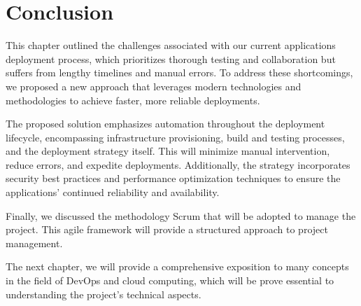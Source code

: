 \section*{Conclusion}
This chapter outlined the challenges associated with our current applications deployment process, which prioritizes thorough testing and collaboration but suffers from lengthy timelines and manual errors. To address these shortcomings, we proposed a new approach that leverages modern technologies and methodologies to achieve faster, more reliable deployments.
\par
The proposed solution emphasizes automation throughout the deployment lifecycle, encompassing infrastructure provisioning, build and testing processes, and the deployment strategy itself. This will minimize manual intervention, reduce errors, and expedite deployments. Additionally, the strategy incorporates security best practices and performance optimization techniques to ensure the applications' continued reliability and availability.
\par
Finally, we discussed the methodology Scrum that will be adopted to manage the project. This agile framework will provide a structured approach to project management.
\par
The next chapter, we will provide a comprehensive exposition to many concepts in the field of DevOps and cloud computing, which will be prove essential to understanding the project's technical aspects.